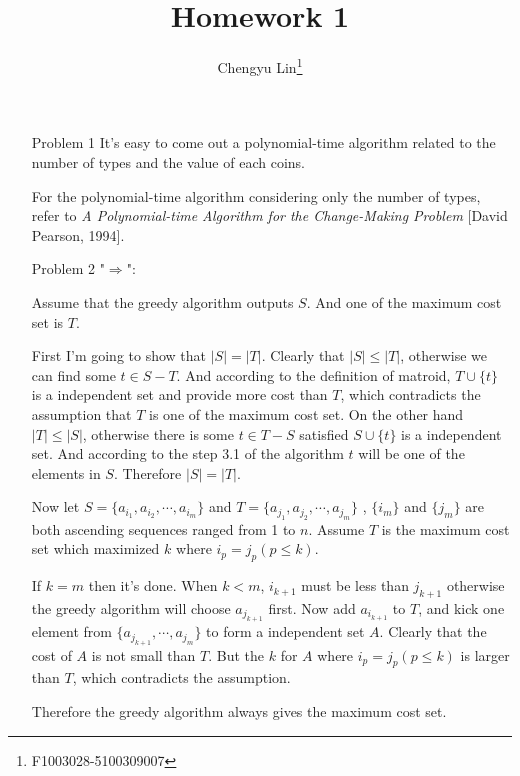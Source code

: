 \documentclass{article}
\title{Homework 1}
\author{Chengyu Lin\footnote{F1003028-5100309007}}
\date{}
\begin{document}
\maketitle

\begin{itemize}
    \item[Problem 1]
        It's easy to come out a polynomial-time algorithm
        related to the number of types and the value of each coins.

        For the polynomial-time algorithm considering only the number of
        types, refer to
        \textit{A Polynomial-time Algorithm for the Change-Making Problem}
        [David Pearson, 1994].

    \item[Problem 2]
        "$\Rightarrow$": 

        Assume that the greedy algorithm outputs $S$. And one of the
        maximum cost set is $T$.

        First I'm going to show that $|S| = |T|$. Clearly that 
        $|S| \leq |T|$, otherwise we can find some $t \in S-T$. And
        according to the definition of matroid, $T \cup \{t\}$ is
        a independent set and provide more cost than $T$, which contradicts
        the assumption that $T$ is one of the maximum cost set.
        On the other hand $|T| \leq |S|$, otherwise there is some 
        $t \in T - S$ satisfied $S \cup \{t\}$ is a independent set.
        And according to the step 3.1 of the algorithm $t$ will be one of 
        the elements in $S$. Therefore $|S| = |T|$.

        Now let $S = \{a_{i_1}, a_{i_2}, \cdots, a_{i_m}\}$
        and $T = \{a_{j_1}, a_{j_2}, \cdots, a_{j_m}\}$
        , $\{i_m\}$ and $\{j_m\}$ are both ascending sequences ranged from
        1 to $n$.
        Assume $T$ is the maximum cost set which maximized $k$ where 
        $i_p = j_p (p \leq k)$.

        If $k = m$ then it's done.
        When $k < m$, $i_{k + 1}$ must be less than $j_{k + 1}$ otherwise
        the greedy algorithm will choose $a_{j_{k + 1}}$ first. Now add
        $a_{i_{k + 1}}$ to $T$, and kick one element from 
        $\{a_{j_{k + 1}}, \cdots, a_{j_m}\}$ to form a independent set $A$.
        Clearly that the cost of $A$ is not small than $T$. But the $k$
        for $A$ where $i_p = j_p (p \leq k)$ is larger than $T$, which
        contradicts the assumption.

        Therefore the greedy algorithm always gives the maximum cost set.


\end{itemize}
\end{document}

